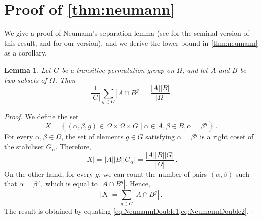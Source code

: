 \documentclass[a4paper]{amsart}
\newtheorem{lemma}[theorem]{Lemma}
\theoremstyle{definition}
\begin{document}
\section{Proof of \cref{thm:neumann}} \label{sec:lowerBound}
We give a proof of Neumann's separation lemma (see \cite{BirchBurnsMacdonaldNeumann1976,Neumann1975} for the seminal version of this result, and \cite[Theorem~5.3]{AraujoCameronSteinberg2017} for our version), and we derive the lower bound in \cref{thm:neumann} as a corollary.

\begin{lemma}\label{lemma:separationNeumann}
    Let $G$ be a transitive permutation group on $\Omega$, and let $A$ and $B$ be two subsets of $\Omega$. Then
    \[ \frac{1}{|G|} \sum_{g\in G} |A\cap B^g| = \frac{|A||B|}{|\Omega|} .\]
\end{lemma}
\begin{proof}
    We define the set
    \[ X= \left\{ (\alpha,\beta,g) \in \Omega \times \Omega \times G \mid \alpha\in A, \beta \in B, \alpha = \beta^g \right\} \,.\]
    For every $\alpha,\beta \in \Omega$, the set of elements $g \in G$ satisfying $\alpha = \beta^g$ is a right coset of the stabiliser $G_\alpha$. Therefore,
    \begin{equation}\label{eq:NeumannDouble1}
        |X| = |A||B||G_\alpha| = \frac{|A||B||G|}{|\Omega|} \,.
    \end{equation}
    On the other hand, for every $g$, we can count the number of pairs $(\alpha,\beta)$ such that $\alpha = \beta^g,$ which is equal to $|A\cap B^g|.$ Hence,
    \begin{equation}\label{eq:NeumannDouble2}
        |X| = \sum_{g\in G} |A\cap B^g| \,.
    \end{equation}
    The result is obtained by equating \cref{eq:NeumannDouble1,eq:NeumannDouble2}.
\end{proof}
\end{document}
